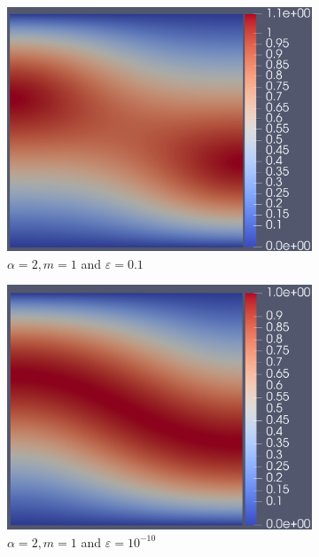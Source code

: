 \documentclass[12pt]{ociamthesis}
\begin{document}
\begin{figure}[H]
\begin{subfigure}{0.44\textwidth}
     \includegraphics[width=\textwidth]{Pics/uf/U_E1b_eps1.png}
     \caption{$\alpha=2, m=1$ and $\varepsilon = 0.1$}
 \end{subfigure}
 \begin{subfigure}{0.44\textwidth}
     \includegraphics[width=\textwidth]{Pics/uf/U_E1b_eps_10.png}
     \caption{$\alpha=2, m=1$ and $\varepsilon = 10^{-10}$}
 \end{subfigure}
 \begin{subfigure}{0.44\textwidth}

\end{subfigure}
\end{figure}
\end{document}
